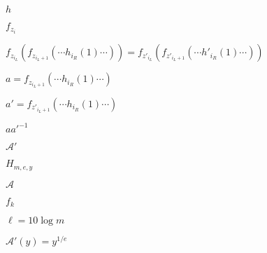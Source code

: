 \documentclass[10pt]{book}
\begin{document}
\begin{mdSnippets}
\begin{mdInlineSnippet}[2510c39011c5be704182423e3a695e91]%
$h$\end{mdInlineSnippet}%
\begin{mdInlineSnippet}[05ac7c2bd83b609e9ade8e3ab26e382d]%
$f_{z_i}$\end{mdInlineSnippet}%
\begin{mdInlineSnippet}[b723f870526f63d9ebf939c21a1f9521]%
$f_{z_{i_L}}(f_{z_{i_L+1}}(\cdots h_{i_R}(1)\cdots)) = f_{z'_{i_L}}(f_{z'_{i_L+1}}(\cdots h'_{i_R}(1)\cdots))$\end{mdInlineSnippet}%
\begin{mdInlineSnippet}[be9090fb1177af42c991bf2d7e2b355b]%
$a = f_{z_{i_L+1}}(\cdots h_{i_R}(1)\cdots)$\end{mdInlineSnippet}%
\begin{mdInlineSnippet}[033efb8961a5e9d460630c33b77e3ed6]%
$a' = f_{z'_{i_L+1}}(\cdots h_{i_R}(1)\cdots)$\end{mdInlineSnippet}%
\begin{mdInlineSnippet}[b1f8fcb1c1ec733c8322558b4078154f]%
$aa'^{-1}$\end{mdInlineSnippet}%
\begin{mdInlineSnippet}%
$\mathcal{A'}$\end{mdInlineSnippet}%
\begin{mdInlineSnippet}[6c541214fedee4698e65eb32d341d9f2]%
$H_{m,e,y}$\end{mdInlineSnippet}%
\begin{mdInlineSnippet}[ad70146b431bea9ae74cf8385470c544]%
$\mathcal{A}$\end{mdInlineSnippet}%
\begin{mdInlineSnippet}[f55fcd9745b34e40639d81c49eb07a8e]%
$f_k$\end{mdInlineSnippet}%
\begin{mdInlineSnippet}[5b3b93a8d14c8f3a682f6b3ee204e446]%
$\ell = 10 \log m$\end{mdInlineSnippet}%
\begin{mdInlineSnippet}[2542397edd7542719141c40c53ec5fc6]%
$\mathcal{A'}(y) = y^{1/e}$\end{mdInlineSnippet}%
\begin{mdInlineSnippet}[66f6ed553b3c90faa9db8076b6031404]%

\end{mdInlineSnippet}
\end{mdSnippets}
\end{document}
